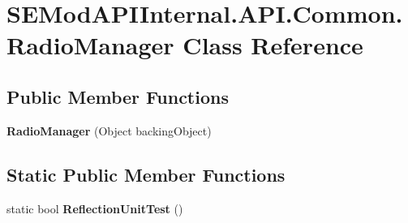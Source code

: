 \hypertarget{class_s_e_mod_a_p_i_internal_1_1_a_p_i_1_1_common_1_1_radio_manager}{}\section{S\+E\+Mod\+A\+P\+I\+Internal.\+A\+P\+I.\+Common.\+Radio\+Manager Class Reference}
\label{class_s_e_mod_a_p_i_internal_1_1_a_p_i_1_1_common_1_1_radio_manager}
\subsection*{Public Member Functions}
\begin{DoxyCompactItemize}
\item 
\hypertarget{class_s_e_mod_a_p_i_internal_1_1_a_p_i_1_1_common_1_1_radio_manager_abed7a92843701b14261bcb04a1373f08}{}{\bfseries Radio\+Manager} (Object backing\+Object)\label{class_s_e_mod_a_p_i_internal_1_1_a_p_i_1_1_common_1_1_radio_manager_abed7a92843701b14261bcb04a1373f08}

\end{DoxyCompactItemize}
\subsection*{Static Public Member Functions}
\begin{DoxyCompactItemize}
\item 
\hypertarget{class_s_e_mod_a_p_i_internal_1_1_a_p_i_1_1_common_1_1_radio_manager_a113996f14ba926c1a982da0960808171}{}static bool {\bfseries Reflection\+Unit\+Test} ()\label{class_s_e_mod_a_p_i_internal_1_1_a_p_i_1_1_common_1_1_radio_manager_a113996f14ba926c1a982da0960808171}

\end{DoxyCompactItemize}
